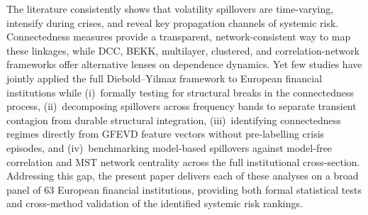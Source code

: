 The literature consistently shows that volatility spillovers are time-varying, intensify
during crises, and reveal key propagation channels of systemic risk. Connectedness
measures provide a transparent, network-consistent way to map these linkages, while DCC,
BEKK, multilayer, clustered, and correlation-network frameworks offer alternative lenses
on dependence dynamics. Yet few studies have jointly applied the full Diebold--Yilmaz framework to European
financial institutions while (i)~formally testing for structural breaks in the
connectedness process, (ii)~decomposing spillovers across frequency bands to separate
transient contagion from durable structural integration, (iii)~identifying connectedness
regimes directly from GFEVD feature vectors without pre-labelling crisis episodes, and
(iv)~benchmarking model-based spillovers against model-free correlation and MST network
centrality across the full institutional cross-section. Addressing this gap, the present
paper delivers each of these analyses on a broad panel of 63 European financial
institutions, providing both formal statistical tests and cross-method validation of the
identified systemic risk rankings.
